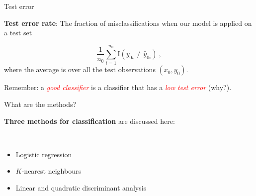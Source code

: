 \documentclass[
  10pt,
  ignorenonframetext,
]{beamer}
\begin{document}
\begin{frame}
\begin{block}{Test error}
\protect\hypertarget{test-error}{}
\(~\)

\textbf{Test error rate}: The fraction of misclassifications when our
model is applied on a test set

\[\frac{1}{n_0}\sum_{i=1}^{n_0} \text{I}(y_{0i} \neq \hat{y}_{0i}) \ ,\]
where the average is over all the test observations \((x_0,y_0)\).

\vspace{6mm}

Remember: a \emph{\textcolor{red}{good classifier}} is a classifier that
has a \emph{\textcolor{red}{low test error}} (why?).
\end{block}
\end{frame}

\begin{frame}
\end{frame}

\begin{frame}
\begin{block}{What are the methods?}
\protect\hypertarget{what-are-the-methods}{}
\(~\)

\textbf{Three methods for classification} are discussed here:

\(~\)

\begin{itemize}
\item
  Logistic regression
\item
  \(K\)-nearest neighbours
\item
  Linear and quadratic discriminant analysis
\end{itemize}
\end{block}
\end{frame}
\end{document}
